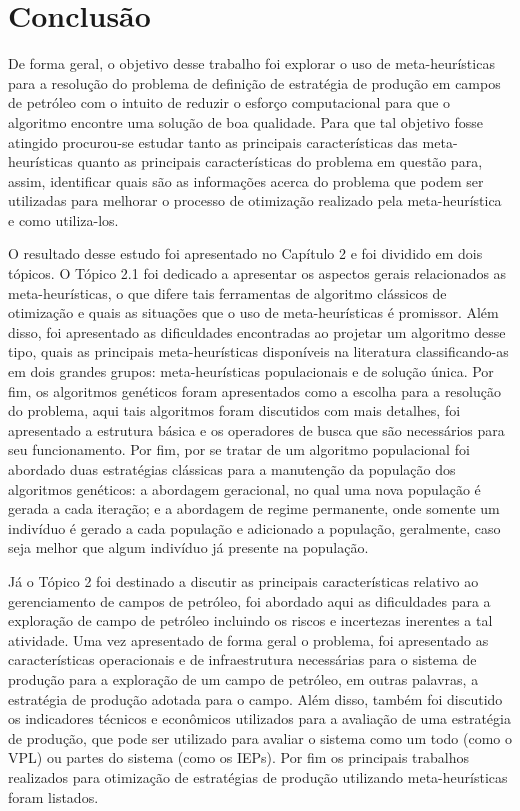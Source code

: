 
\chapter{Conclusão}
\label{ch:ch6}
De forma geral, o objetivo desse trabalho foi explorar o uso de meta-heurísticas para a resolução do problema de definição de estratégia de produção em campos de petróleo com o intuito de reduzir o esforço computacional para que o algoritmo encontre uma solução de boa qualidade. Para que tal objetivo fosse atingido procurou-se estudar tanto as principais características das meta-heurísticas quanto as principais características do problema em questão para, assim, identificar quais são as informações acerca do problema que podem ser utilizadas para melhorar o processo de otimização realizado pela meta-heurística e como utiliza-los.  

O resultado desse estudo foi apresentado no Capítulo 2 e foi dividido em dois tópicos. O Tópico 2.1 foi dedicado a apresentar os aspectos gerais relacionados as meta-heurísticas, o que difere tais ferramentas de algoritmo clássicos de otimização e quais as situações que o uso de meta-heurísticas é promissor. Além disso, foi apresentado as dificuldades encontradas ao projetar um algoritmo desse tipo, quais as principais meta-heurísticas disponíveis na literatura classificando-as em dois grandes grupos: meta-heurísticas populacionais e de solução única. Por fim, os algoritmos genéticos foram apresentados como a escolha para a resolução do problema, aqui tais algoritmos foram discutidos com mais detalhes, foi apresentado a estrutura básica e os operadores de busca que são necessários para seu funcionamento. Por fim, por se tratar de um algoritmo populacional foi abordado duas estratégias clássicas para a manutenção da população dos algoritmos genéticos: a abordagem geracional, no qual uma nova população é gerada a cada iteração; e a abordagem de regime permanente, onde somente um indivíduo é gerado a cada população e adicionado a população, geralmente, caso seja melhor que algum indivíduo já presente na população. 

Já o Tópico 2 foi destinado a discutir as principais características relativo ao gerenciamento de campos de petróleo, foi abordado aqui as dificuldades para a exploração de campo de petróleo incluindo os riscos e incertezas inerentes a tal atividade. Uma vez apresentado de forma geral o problema, foi apresentado as características operacionais e de infraestrutura necessárias para o sistema de produção para a exploração de um campo de petróleo, em outras palavras, a estratégia de produção adotada para o campo. Além disso, também foi discutido os indicadores técnicos e econômicos utilizados para a avaliação de uma estratégia de produção, que pode ser utilizado para avaliar o sistema como um todo (como o VPL) ou partes do sistema (como os IEPs). Por fim os principais trabalhos realizados para otimização de estratégias de produção utilizando meta-heurísticas foram listados.

